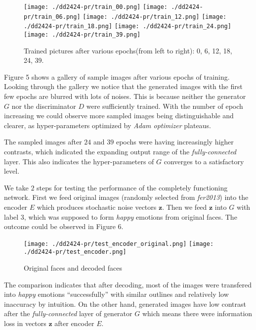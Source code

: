 \documentclass[runningheads]{llncs}
\begin{document}
\begin{figure}
\begin{center}
\texttt{[image: ./dd2424-pr/train\_00.png]}
\texttt{[image: ./dd2424-pr/train\_06.png]}
\texttt{[image: ./dd2424-pr/train\_12.png]}
\texttt{[image: ./dd2424-pr/train\_18.png]}
\texttt{[image: ./dd2424-pr/train\_24.png]}
\texttt{[image: ./dd2424-pr/train\_39.png]}
\caption{Trained pictures after various epochs(from left to right): 0, 6, 12, 18, 24, 39.}
\end{center}
\end{figure}

Figure 5 shows a gallery of sample images after various epochs of training. Looking through the gallery we notice that the generated images with the first few epochs are blurred with lots of noises. This is because neither the generator $G$ nor the discriminator $D$ were sufficiently trained. With the number of epoch increasing we could observe more sampled images being distinguishable and clearer, as hyper-parameters optimized by \textit{Adam optimizer} plateaus.

The sampled images after $24$ and $39$ epochs were having increasingly higher contrasts, which indicated the expanding output range of the \textit{fully-connected} layer. This also indicates the hyper-parameters of $G$ converges to a satisfactory level.

We take $2$ steps for testing the performance of the completely functioning network. First we feed original images (randomly selected from \textit{fer2013}) into the encoder $E$ which produces stochastic noise vectors $\mathbf{z}$. Then we feed $\mathbf{z}$ into $G$ with label $3$, which was supposed to form \textit{happy} emotions from original faces. The outcome could be observed in Figure 6.\newline
\begin{figure}
\begin{center}
\texttt{[image: ./dd2424-pr/test\_encoder\_original.png]}
\texttt{[image: ./dd2424-pr/test\_encoder.png]}
\caption{ Original faces and decoded faces }
\end{center}
\end{figure}
The comparison indicates that after decoding, most of the images were transfered into \textit{happy} emotions ``successfully'' with similar outlines and relatively low inaccuracy by intuition. On the other hand, generated images have low contrast after the \textit{fully-connected} layer of generator $G$ which means there were information loss in vectors $\mathbf{z}$ after encoder $E$. 
\end{document}
